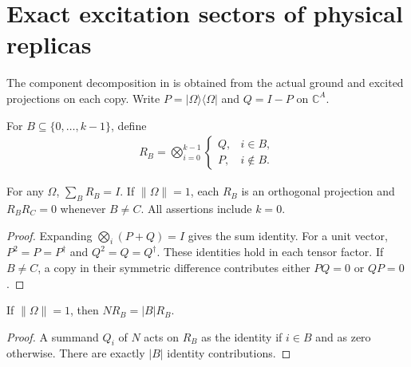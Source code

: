 \section{Exact excitation sectors of physical replicas}
\label{sec:replica_excitation}

The component decomposition in \cite[Section~7]{OpenAI2026AreaLaw} is
obtained from the actual ground and excited projections on each copy.
Write $P=|\Omega\rangle\langle\Omega|$ and $Q=I-P$ on $\mathbb C^A$.

\begin{definition}
\label{def:replica_excitation_projection}
\leanok
For $B\subseteq\{0,\ldots,k-1\}$, define
\begin{align}
 R_B=\bigotimes_{i=0}^{k-1}\label{eq:replica_excitation_projection}
 \begin{cases}Q,&i\in B,\\ P,&i\notin B.\end{cases}
\end{align}
\end{definition}

\begin{theorem}
\label{thm:replica_excitation_partition}
\leanok
{}
For any $\Omega$, $\sum_B R_B=I$.
If $\|\Omega\|=1$, each $R_B$ is an orthogonal projection and
$R_BR_C=0$ whenever $B\ne C$.
All assertions include $k=0$.
\end{theorem}
\begin{proof}
\leanok
Expanding $\bigotimes_i(P+Q)=I$ gives the sum identity. For a unit vector,
$P^2=P=P^\dagger$ and $Q^2=Q=Q^\dagger$.
These identities hold in each tensor factor. If $B\ne C$, a copy in their
symmetric difference contributes either $PQ=0$ or $QP=0$.
\end{proof}

\begin{theorem}
\label{thm:replica_sector_count}
\leanok
{}
If $\|\Omega\|=1$, then $NR_B=|B|R_B$.
\end{theorem}
\begin{proof}
\leanok
A summand $Q_i$ of $N$ acts on $R_B$ as the identity if $i\in B$ and
as zero otherwise. There are exactly $|B|$ identity contributions.
\end{proof}

